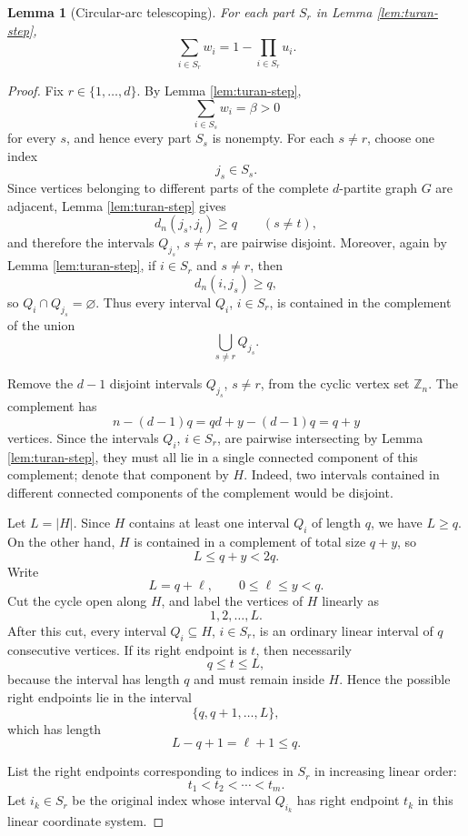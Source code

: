 \documentclass[10pt,a4paper]{amsart}
\newtheorem{lemma}{Lemma}
\newcommand{\Zn}{\mathbb Z_n}
\begin{document}
\begin{lemma}[Circular-arc telescoping]\label{lem:telescoping}
For each part $S_r$ in Lemma \ref{lem:turan-step},
\[
        \sum_{i\in S_r}w_i=1-\prod_{i\in S_r}u_i.
\]
\end{lemma}

\begin{proof}
Fix $r\in\{1,\ldots,d\}$. By Lemma \ref{lem:turan-step},
\[
        \sum_{i\in S_s} w_i=\beta>0
\]
for every $s$, and hence every part $S_s$ is nonempty. For each $s\ne r$,
choose one index
\[
        j_s\in S_s.
\]
Since vertices belonging to different parts of the complete $d$-partite graph
$G$ are adjacent, Lemma \ref{lem:turan-step} gives
\[
        d_n(j_s,j_t)\ge q\qquad (s\ne t),
\]
and therefore the intervals $Q_{j_s}$, $s\ne r$, are pairwise disjoint.
Moreover, again by Lemma \ref{lem:turan-step}, if $i\in S_r$ and $s\ne r$,
then
\[
        d_n(i,j_s)\ge q,
\]
so $Q_i\cap Q_{j_s}=\varnothing$. Thus every interval $Q_i$, $i\in S_r$, is
contained in the complement of the union
\[
        \bigcup_{s\ne r} Q_{j_s}.
\]

Remove the $d-1$ disjoint intervals $Q_{j_s}$, $s\ne r$, from the cyclic
vertex set $\Zn$. The complement has
\[
        n-(d-1)q=qd+y-(d-1)q=q+y
\]
vertices. Since the intervals $Q_i$, $i\in S_r$, are pairwise intersecting by
Lemma \ref{lem:turan-step}, they must all lie in a single connected component
of this complement; denote that component by $H$. Indeed, two intervals
contained in different connected components of the complement would be
disjoint.

Let $L=|H|$. Since $H$ contains at least one interval $Q_i$ of length $q$, we
have $L\ge q$. On the other hand, $H$ is contained in a complement of total
size $q+y$, so
\[
        L\le q+y<2q.
\]
Write
\[
        L=q+\ell,\qquad 0\le \ell\le y<q.
\]
Cut the cycle open along $H$, and label the vertices of $H$ linearly as
\[
        1,2,\ldots,L.
\]
After this cut, every interval $Q_i\subseteq H$, $i\in S_r$, is an ordinary
linear interval of $q$ consecutive vertices. If its right endpoint is $t$,
then necessarily
\[
        q\le t\le L,
\]
because the interval has length $q$ and must remain inside $H$. Hence the
possible right endpoints lie in the interval
\[
        \{q,q+1,\ldots,L\},
\]
which has length
\[
        L-q+1=\ell+1\le q.
\]

List the right endpoints corresponding to indices in $S_r$ in increasing
linear order:
\[
        t_1<t_2<\cdots<t_m.
\]
Let $i_k\in S_r$ be the original index whose interval $Q_{i_k}$ has right
endpoint $t_k$ in this linear coordinate system.


\end{proof}
\end{document}
